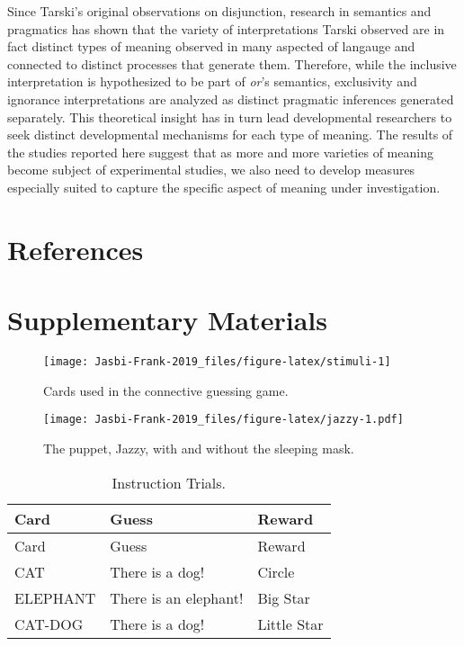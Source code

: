\documentclass[,man,floatsintext]{apa6}
\begin{document}
Since Tarski's original observations on disjunction, research in semantics and pragmatics has shown that the variety of interpretations Tarski observed are in fact distinct types of meaning observed in many aspected of langauge and connected to distinct processes that generate them. Therefore, while the inclusive interpretation is hypothesized to be part of \emph{or}'s semantics, exclusivity and ignorance interpretations are analyzed as distinct pragmatic inferences generated separately. This theoretical insight has in turn lead developmental researchers to seek distinct developmental mechanisms for each type of meaning. The results of the studies reported here suggest that as more and more varieties of meaning become subject of experimental studies, we also need to develop measures especially suited to capture the specific aspect of meaning under investigation.

\newpage

\hypertarget{references}{%
\section{References}\label{references}}

\newpage

\hypertarget{supplementary-materials}{%
\section{Supplementary Materials}\label{supplementary-materials}}

\begin{figure}

{\centering \texttt{[image: Jasbi-Frank-2019\_files/figure-latex/stimuli-1]} 

}

\caption{Cards used in the connective guessing game.}\label{fig:stimuli}
\end{figure}

\begin{figure}
\centering
\texttt{[image: Jasbi-Frank-2019\_files/figure-latex/jazzy-1.pdf]}
\caption{\label{fig:jazzy}The puppet, Jazzy, with and without the sleeping mask.}
\end{figure}

\begin{longtable}[]{@{}lll@{}}
\caption{\label{tab:instruction} Instruction Trials.}\tabularnewline
\toprule
Card & Guess & Reward\tabularnewline
\midrule
\endfirsthead
\toprule
Card & Guess & Reward\tabularnewline
\midrule
\endhead
CAT & There is a dog! & Circle\tabularnewline
ELEPHANT & There is an elephant! & Big Star\tabularnewline
CAT-DOG & There is a dog! & Little Star\tabularnewline
\bottomrule
\end{longtable}
\end{document}
